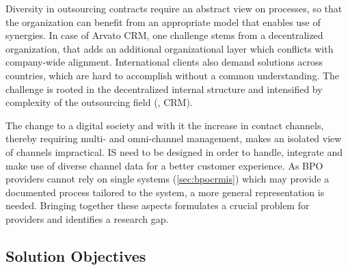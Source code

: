 Diversity in outsourcing contracts require an abstract view on processes, so that the organization can benefit from an appropriate model that enables use of synergies. In case of Arvato CRM, one challenge stems from a decentralized organization, that adds an additional organizational layer which conflicts with company-wide alignment. International clients also demand solutions across countries, which are hard to accomplish without a common understanding. The challenge is rooted in the decentralized internal structure and intensified by complexity of the outsourcing field (\eg, \acrshort{CRM}).

The change to a digital society and with it the increase in contact channels, thereby requiring multi- and omni-channel management, makes an isolated view of channels impractical. \acrshort{IS} need to be designed in order to handle, integrate and make use of diverse channel data for a better customer experience. As BPO providers cannot rely on single systems (\cf \ref{sec:bpocrmis}) which may provide a documented process tailored to the system, a more general representation is needed. Bringing together these aspects formulates a crucial problem for providers and identifies a research gap. 



\subsection{Solution Objectives}
\label{sec:solobj}


